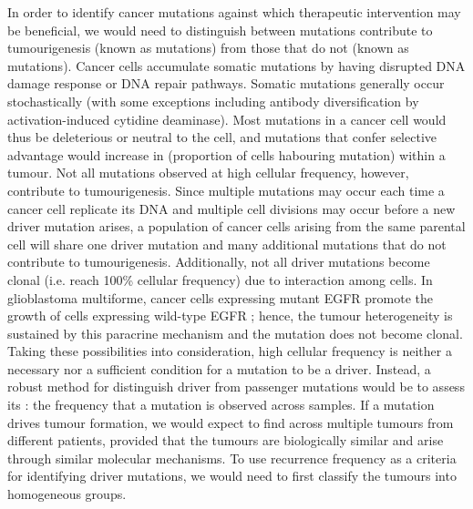 In order to identify cancer mutations against which therapeutic intervention may be beneficial, we would need to distinguish between mutations contribute to tumourigenesis (known as  mutations) from those that do not (known as  mutations). Cancer cells accumulate somatic mutations by having disrupted DNA damage response or DNA repair pathways. Somatic mutations generally occur stochastically (with some exceptions including antibody diversification by activation-induced cytidine deaminase). Most mutations in a cancer cell would thus be deleterious or neutral to the cell, and mutations that confer selective advantage would increase in  (proportion of cells habouring mutation) within a tumour. Not all mutations observed at high cellular frequency, however, contribute to tumourigenesis. Since multiple mutations may occur each time a cancer cell replicate its DNA and multiple cell divisions may occur before a new driver mutation arises, a population of cancer cells arising from the same parental cell will share one driver mutation and many additional mutations that do not contribute to tumourigenesis. Additionally, not all driver mutations become clonal (i.e. reach 100\% cellular frequency) due to interaction among cells. In glioblastoma multiforme, cancer cells expressing mutant EGFR promote the growth of cells expressing wild-type EGFR ; hence, the tumour heterogeneity is sustained by this paracrine mechanism and the  mutation does not become clonal. Taking these possibilities into consideration, high cellular frequency is neither a necessary nor a sufficient condition for a mutation to be a driver. Instead, a robust method for distinguish driver from passenger mutations would be to assess its : the frequency that a mutation is observed across samples. If a mutation drives tumour formation, we would expect to find across multiple tumours from different patients, provided that the tumours are biologically similar and arise through similar molecular mechanisms. To use recurrence frequency as a criteria for identifying driver mutations, we would need to first classify the tumours into homogeneous groups.

